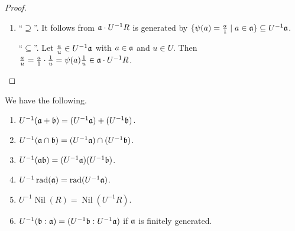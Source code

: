 \begin{proof}
\begin{enumerate}
            \begin{center}
            \end{center}
        \item 
            ``$\supseteq$''. It follows from $\mathfrak{a} \cdot U^{-1}R$ is generated by $\{\psi(a) = \frac{a}{1} \mid a \in \mathfrak{a}\} \subseteq U^{-1}\mathfrak{a}$. \par 
            ``$\subseteq$''. Let $\frac{a}{u} \in U^{-1}\mathfrak{a}$ with $a \in \mathfrak{a}$ and $u \in U$. Then $\frac{a}{u} = \frac{a}{1} \cdot \frac{1}{u} = \psi(a)\frac{1}{u} \in \mathfrak{a} \cdot U^{-1}R$. \qedhere
    \end{enumerate}
\end{proof}

\begin{proposition}\label{3.12}
    We have the following.
    \begin{enumerate}
        \item\label{3.12a} $U^{-1}(\mathfrak{a} + \mathfrak{b}) = (U^{-1}\mathfrak{a}) + (U^{-1}\mathfrak{b})$.
        \item\label{3.12b} $U^{-1}(\mathfrak{a} \cap \mathfrak{b}) = (U^{-1}\mathfrak{a}) \cap (U^{-1}\mathfrak{b})$.
        \item\label{3.12c} $U^{-1}(\mathfrak{a} \mathfrak{b}) = (U^{-1}\mathfrak{a}) (U^{-1}\mathfrak{b})$.
        \item\label{3.12d} $U^{-1} \operatorname{rad}(\mathfrak{a}) = \operatorname{rad}(U^{-1}\mathfrak{a})$.
        \item\label{3.12e} $U^{-1}\operatorname{Nil}(R) = \operatorname{Nil}(U^{-1}R)$.
        \item\label{3.12f} $U^{-1}(\mathfrak{b}:\mathfrak{a}) = (U^{-1}\mathfrak{b}:U^{-1}\mathfrak{a})$  if $\mathfrak{a}$ is finitely generated.
    \end{enumerate}
\end{proposition}

